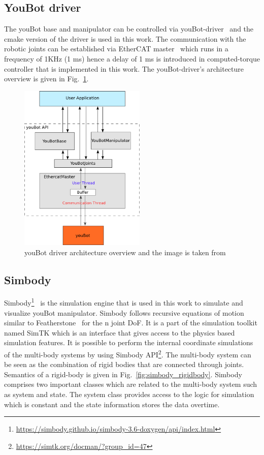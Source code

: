 \subsection*{YouBot driver}

The youBot base and manipulator can be controlled via youBot-driver~\cite{youbotdriver} and the cmake version of the driver is used in this work. The communication with the robotic joints can be established via EtherCAT master~\cite{youbotdriver} which runs in a frequency of 1KHz (1 ms) hence a delay of 1 ms is introduced in computed-torque controller that is implemented in this work. The youBot-driver's architecture overview is given in Fig.~\ref{fig:youbotdriverarchitecture}. 

\begin{figure}[h]
\centering
\includegraphics[width=60mm, trim=0 0 0 0]{pictures/youbotdriver_architecture}
\caption{youBot driver architecture overview and the image is taken from~\cite{youbotdriver_architecture}}
\label{fig:youbotdriverarchitecture}
\end{figure}

\subsection*{Simbody}

Simbody\footnote{\url{https://simbody.github.io/simbody-3.6-doxygen/api/index.html}}~\cite{sherman2011simbody} is the simulation engine that is used in this work to simulate and visualize youBot manipulator. Simbody follows recursive equations of motion similar to Featherstone~\cite{featherstone2014rigid} for the n joint DoF. It is a part of the simulation toolkit named SimTK which is an interface that gives access to the physics based simulation features. It is possible to perform the internal coordinate simulations of the multi-body systems by using Simbody API\footnote{\url{https://simtk.org/docman/?group_id=47}}. The multi-body system can be seen as the combination of rigid bodies that are connected through joints. Semantics of a rigid-body is given in Fig.~\ref{fig:simbody_rigidbody}. Simbody comprises two important classes which are related to the multi-body system such as system and state. The system class provides access to the logic for simulation which is constant and the state information stores the data overtime. 

